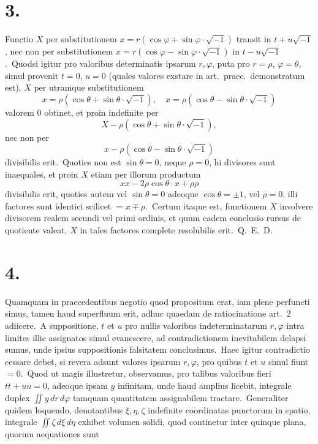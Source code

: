 \documentclass[12pt,a4paper]{article}
\theoremstyle{plain}
\begin{document}
\section*{3.}

Functio $X$ per substitutionem $x = r(\cos\varphi + \sin\varphi \cdot \sqrt{-1})$ transit in $t + u\sqrt{-1}$,
nec non per substitutionem $x = r(\cos\varphi - \sin\varphi \cdot \sqrt{-1})$ in $t - u\sqrt{-1}$.\ Quodsi
igitur pro valoribus determinatis ipsarum $r, \varphi$, puta pro $r = \rho$, $\varphi = \theta$, simul
provenit $t = 0$, $u = 0$ (quales valores exstare in art.\ praec.\ demonstratum est),
$X$ per utramque substitutionem
\[
x = \rho(\cos\theta + \sin\theta \cdot \sqrt{-1}), \quad x = \rho(\cos\theta - \sin\theta \cdot \sqrt{-1})
\]
valorem $0$ obtinet, et proin indefinite per
\[
X - \rho(\cos\theta + \sin\theta \cdot \sqrt{-1}),
\]
nec non per
\[
x - \rho(\cos\theta - \sin\theta \cdot \sqrt{-1})
\]
divisibilis erit.\ Quoties non est $\sin\theta = 0$, neque $\rho = 0$, hi divisores sunt
inaequales, et proin $X$ etiam per illorum productum
\[
xx - 2\rho\cos\theta \cdot x + \rho\rho
\]
divisibilis erit, quoties autem vel $\sin\theta = 0$ adeoque $\cos\theta = \pm 1$, vel $\rho = 0$,
illi factores sunt identici scilicet $= x \mp \rho$.\ Certum itaque est, functionem $X$
involvere divisorem realem secundi vel primi ordinis, et quum eadem conclusio
rursus de quotiente valeat, $X$ in tales factores complete resolubilis erit.\ Q.\ E.\ D.

\section*{4.}

Quamquam in praecedentibus negotio quod propositum erat, iam plene perfuncti simus, tamen haud superfluum erit, adhuc quaedam de ratiocinatione art.\ 2
adiicere.\ A suppositione, $t$ et $u$ pro nullis valoribus indeterminatarum $r, \varphi$ intra limites illic assignatos simul evanescere, ad contradictionem inevitabilem delapsi sumus, unde ipsius suppositionis falsitatem conclusimus.\ Haec igitur contradictio cessare debet, si revera adsunt valores ipsarum $r, \varphi$, pro quibus $t$ et $u$
simul fiunt $= 0$.\ Quod ut magis illustretur, observamus, pro talibus valoribus
fieri $tt + uu = 0$, adeoque ipsam $y$ infinitam, unde haud amplius licebit,
integrale duplex $\iint y\, dr\, d\varphi$ tamquam quantitatem assignabilem tractare.\ Generaliter quidem loquendo, denotantibus $\xi, \eta, \zeta$ indefinite coordinatas punctorum in
spatio, integrale $\iint \zeta\, d\xi\, d\eta$ exhibet volumen solidi, quod continetur inter quinque plana, quorum aequationes sunt
\end{document}

